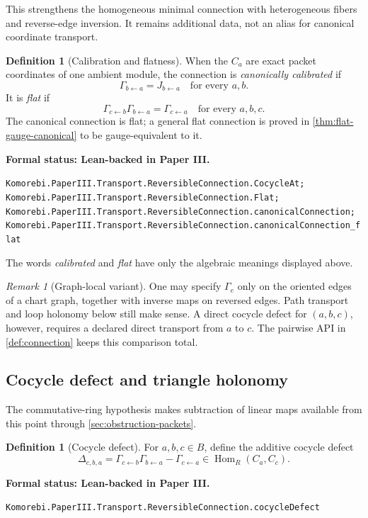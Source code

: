 \documentclass[11pt]{article}
\theoremstyle{definition}
\newtheorem{definition}[theorem]{Definition}
\theoremstyle{remark}
\newtheorem{remark}[theorem]{Remark}
\newcommand{\Hom}{\operatorname{Hom}}
\newcommand{\leanname}[1]{\nolinkurl{#1}}
\newcommand{\statusleanthree}[1]{%
  \par\smallskip\noindent
  {\color{leanblue}\textbf{Formal status: Lean-backed in Paper III.}}\par
  \begingroup\small\raggedright\leanname{#1}\par\endgroup\smallskip}
\begin{document}
This strengthens the homogeneous minimal connection with heterogeneous
fibers and reverse-edge inversion.  It remains additional data, not an alias
for canonical coordinate transport.

\begin{definition}[Calibration and flatness]
\label{def:calibration-flatness}
When the $C_a$ are exact packet coordinates of one ambient module, the
connection is \emph{canonically calibrated} if
\[
\Gamma_{b\leftarrow a}=J_{b\leftarrow a}
\quad\text{for every }a,b.
\]
It is \emph{flat} if
\[
\Gamma_{c\leftarrow b}\Gamma_{b\leftarrow a}
=
\Gamma_{c\leftarrow a}
\quad\text{for every }a,b,c.
\]
The canonical connection is flat; a general flat connection is proved in
\cref{thm:flat-gauge-canonical} to be gauge-equivalent to it.
\end{definition}
\statusleanthree{Komorebi.PaperIII.Transport.ReversibleConnection.CocycleAt; Komorebi.PaperIII.Transport.ReversibleConnection.Flat; Komorebi.PaperIII.Transport.ReversibleConnection.canonicalConnection; Komorebi.PaperIII.Transport.ReversibleConnection.canonicalConnection_flat}

The words \emph{calibrated} and \emph{flat} have only the algebraic meanings
displayed above.

\begin{remark}[Graph-local variant]
One may specify $\Gamma_e$ only on the oriented edges of a chart graph,
together with inverse maps on reversed edges.  Path transport and loop
holonomy below still make sense.  A direct cocycle defect for $(a,b,c)$,
however, requires a declared direct transport from $a$ to $c$.  The pairwise
API in \cref{def:connection} keeps this comparison total.
\end{remark}

\subsection{Cocycle defect and triangle holonomy}

The commutative-ring hypothesis makes subtraction of linear maps available
from this point through \cref{sec:obstruction-packets}.

\begin{definition}[Cocycle defect]
\label{def:cocycle-defect}
For $a,b,c\in B$, define the additive cocycle defect
\[
\Delta_{c,b,a}
=
\Gamma_{c\leftarrow b}\Gamma_{b\leftarrow a}
-\Gamma_{c\leftarrow a}
\in\Hom_R(C_a,C_c).
\]
\end{definition}
\statusleanthree{Komorebi.PaperIII.Transport.ReversibleConnection.cocycleDefect}
\end{document}
